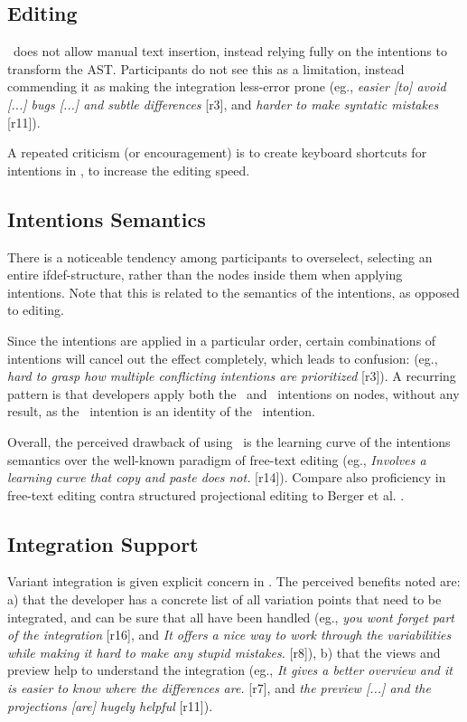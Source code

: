 \subsection{Editing}
\tooln~does not allow manual text insertion, instead relying fully on the intentions to transform the AST. Participants do not see this as a limitation, instead commending it as making the integration less-error prone (eg., \textit{\bc easier [to] avoid [...] bugs [...] and subtle differences\ec} [r3], and \textit{\bc harder to make syntatic mistakes\ec} [r11]).

A repeated criticism (or encouragement) is to create keyboard shortcuts for intentions in \tooln, to increase the editing speed.


\subsection{Intentions Semantics}
There is a noticeable tendency among participants to overselect, selecting an entire ifdef-structure, rather than the nodes inside them when applying intentions. Note that this is related to the semantics of the intentions, as opposed to editing.

Since the intentions are applied in a particular order, certain combinations of intentions will cancel out the effect completely, which leads to confusion: (eg., \textit{\bc hard to grasp how multiple conflicting intentions are prioritized\ec} [r3]). A recurring pattern is that developers apply both the \keep~and \keepasf~intentions on nodes, without any result, as the \keep~intention is an identity of the \keepasf~intention.

Overall, the perceived drawback of using \tooln~is the learning curve of the intentions semantics over the well-known paradigm of free-text editing (eg., \textit{\bc Involves a learning curve that copy and paste does not.\ec} [r14]). Compare also proficiency in free-text editing contra structured projectional editing to Berger et al. \cite{berger2016mps}.

\subsection{Integration Support}
Variant integration is given explicit concern in \tooln. The perceived benefits noted are: a) that the developer has a concrete list of all variation points that need to be integrated, and can be sure that all have been handled (eg., \textit{\bc you wont forget part of the integration\ec} [r16], and \textit{\bc It offers a nice way to work through the variabilities while making it hard to make any stupid mistakes.\ec} [r8]), b) that the views and preview help to understand the integration (eg., \textit{\bc It gives a better overview and it is easier to know where the differences are.\ec} [r7], and \textit{\bc the preview [...] and the projections [are] hugely helpful\ec} [r11]).


